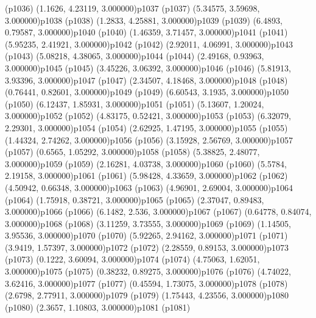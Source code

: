 \psdot(p1036)
\psPoint(1.1626, 4.23119, 3.000000){p1037}
\psdot(p1037)
\psPoint(5.34575, 3.59698, 3.000000){p1038}
\psdot(p1038)
\psPoint(1.2833, 4.25881, 3.000000){p1039}
\psdot(p1039)
\psPoint(6.4893, 0.79587, 3.000000){p1040}
\psdot(p1040)
\psPoint(1.46359, 3.71457, 3.000000){p1041}
\psdot(p1041)
\psPoint(5.95235, 2.41921, 3.000000){p1042}
\psdot(p1042)
\psPoint(2.92011, 4.06991, 3.000000){p1043}
\psdot(p1043)
\psPoint(5.08218, 4.38065, 3.000000){p1044}
\psdot(p1044)
\psPoint(2.49168, 0.93963, 3.000000){p1045}
\psdot(p1045)
\psPoint(3.45226, 3.06392, 3.000000){p1046}
\psdot(p1046)
\psPoint(5.81913, 3.93396, 3.000000){p1047}
\psdot(p1047)
\psPoint(2.34507, 4.18468, 3.000000){p1048}
\psdot(p1048)
\psPoint(0.76441, 0.82601, 3.000000){p1049}
\psdot(p1049)
\psPoint(6.60543, 3.1935, 3.000000){p1050}
\psdot(p1050)
\psPoint(6.12437, 1.85931, 3.000000){p1051}
\psdot(p1051)
\psPoint(5.13607, 1.20024, 3.000000){p1052}
\psdot(p1052)
\psPoint(4.83175, 0.52421, 3.000000){p1053}
\psdot(p1053)
\psPoint(6.32079, 2.29301, 3.000000){p1054}
\psdot(p1054)
\psPoint(2.62925, 1.47195, 3.000000){p1055}
\psdot(p1055)
\psPoint(1.44324, 2.74262, 3.000000){p1056}
\psdot(p1056)
\psPoint(3.15928, 2.56769, 3.000000){p1057}
\psdot(p1057)
\psPoint(0.6565, 1.05292, 3.000000){p1058}
\psdot(p1058)
\psPoint(5.38825, 2.48077, 3.000000){p1059}
\psdot(p1059)
\psPoint(2.16281, 4.03738, 3.000000){p1060}
\psdot(p1060)
\psPoint(5.5784, 2.19158, 3.000000){p1061}
\psdot(p1061)
\psPoint(5.98428, 4.33659, 3.000000){p1062}
\psdot(p1062)
\psPoint(4.50942, 0.66348, 3.000000){p1063}
\psdot(p1063)
\psPoint(4.96901, 2.69004, 3.000000){p1064}
\psdot(p1064)
\psPoint(1.75918, 0.38721, 3.000000){p1065}
\psdot(p1065)
\psPoint(2.37047, 0.89483, 3.000000){p1066}
\psdot(p1066)
\psPoint(6.1482, 2.536, 3.000000){p1067}
\psdot(p1067)
\psPoint(0.64778, 0.84074, 3.000000){p1068}
\psdot(p1068)
\psPoint(3.11259, 3.73555, 3.000000){p1069}
\psdot(p1069)
\psPoint(1.14505, 3.95536, 3.000000){p1070}
\psdot(p1070)
\psPoint(5.92265, 2.94162, 3.000000){p1071}
\psdot(p1071)
\psPoint(3.9419, 1.57397, 3.000000){p1072}
\psdot(p1072)
\psPoint(2.28559, 0.89153, 3.000000){p1073}
\psdot(p1073)
\psPoint(0.1222, 3.60094, 3.000000){p1074}
\psdot(p1074)
\psPoint(4.75063, 1.62051, 3.000000){p1075}
\psdot(p1075)
\psPoint(0.38232, 0.89275, 3.000000){p1076}
\psdot(p1076)
\psPoint(4.74022, 3.62416, 3.000000){p1077}
\psdot(p1077)
\psPoint(0.45594, 1.73075, 3.000000){p1078}
\psdot(p1078)
\psPoint(2.6798, 2.77911, 3.000000){p1079}
\psdot(p1079)
\psPoint(1.75443, 4.23556, 3.000000){p1080}
\psdot(p1080)
\psPoint(2.3657, 1.10803, 3.000000){p1081}
\psdot(p1081)
